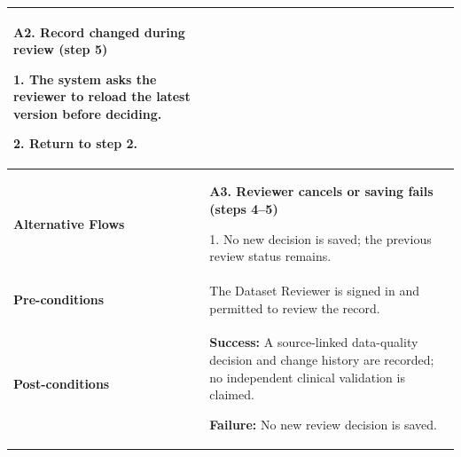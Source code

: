 \begin{longtable}{|p{}|p{}|}
\textbf{A2. Record changed during review (step 5)}\par
1. The system asks the reviewer to reload the latest version before deciding.\par
2. Return to step 2.
\\ \hline
\textbf{Alternative Flows} &
\textbf{A3. Reviewer cancels or saving fails (steps 4--5)}\par
1. No new decision is saved; the previous review status remains.
\\ \hline
\textbf{Pre-conditions} &
The Dataset Reviewer is signed in and permitted to review the record.
\\ \hline
\textbf{Post-conditions} &
\textbf{Success:} A source-linked data-quality decision and change history are recorded; no independent clinical validation is claimed.\par
\textbf{Failure:} No new review decision is saved.
\\ \hline
\end{longtable}
\clearpage
